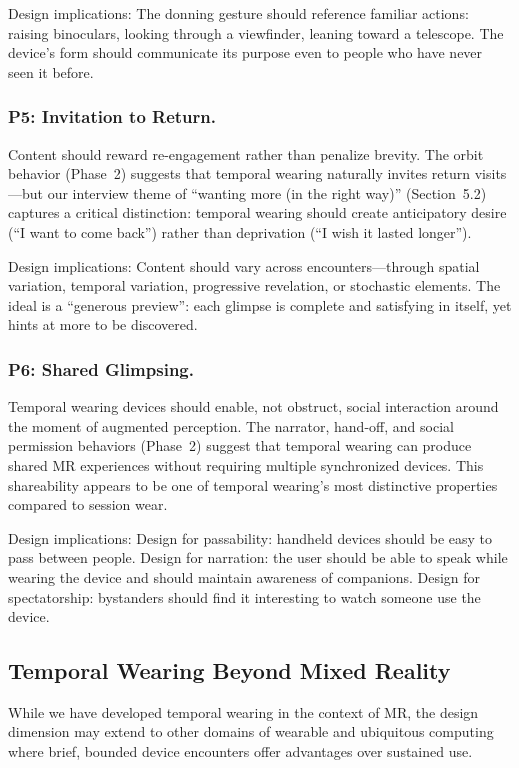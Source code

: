 Design implications: The donning gesture should reference familiar actions: raising binoculars, looking through a viewfinder, leaning toward a telescope. The device's form should communicate its purpose even to people who have never seen it before.

\subsubsection{P5: Invitation to Return.}
Content should reward re-engagement rather than penalize brevity. The orbit behavior (Phase~2) suggests that temporal wearing naturally invites return visits---but our interview theme of ``wanting more (in the right way)'' (Section~5.2) captures a critical distinction: temporal wearing should create anticipatory desire (``I want to come back'') rather than deprivation (``I wish it lasted longer'').

Design implications: Content should vary across encounters---through spatial variation, temporal variation, progressive revelation, or stochastic elements. The ideal is a ``generous preview'': each glimpse is complete and satisfying in itself, yet hints at more to be discovered.

\subsubsection{P6: Shared Glimpsing.}
Temporal wearing devices should enable, not obstruct, social interaction around the moment of augmented perception. The narrator, hand-off, and social permission behaviors (Phase~2) suggest that temporal wearing can produce shared MR experiences without requiring multiple synchronized devices. This shareability appears to be one of temporal wearing's most distinctive properties compared to session wear.

Design implications: Design for passability: handheld devices should be easy to pass between people. Design for narration: the user should be able to speak while wearing the device and should maintain awareness of companions. Design for spectatorship: bystanders should find it interesting to watch someone use the device.

\subsection{Temporal Wearing Beyond Mixed Reality}

While we have developed temporal wearing in the context of MR, the design dimension may extend to other domains of wearable and ubiquitous computing where brief, bounded device encounters offer advantages over sustained use.

